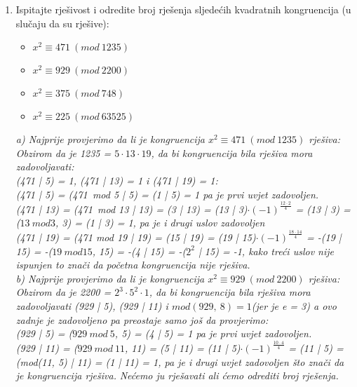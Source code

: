 \documentclass[12pt]{article}
\begin{document}
\begin{enumerate}
\begin{center}
            \end{center}
	    \item Ispitajte rješivost i odredite broj rješenja sljedećih kvadratnih kongruencija (u slučaju da su rješive):
        \begin{center}
        \begin{itemize}
            \item $x^2\equiv 471\ (mod\ 1235)$
            \item $x^2\equiv 929\ (mod\ 2200)$
            \item $x^2\equiv 375\ (mod\ 748)$
            \item $x^2\equiv 225\ (mod\ 63525)$
        \end{itemize}
          \vspace*{0.75cm}
        \textit{a) Najprije provjerimo da li je kongruencija $x^2\equiv 471\ (mod\ 1235)$ rješiva:\\Obzirom da je 1235 = $5\cdot13\cdot19$, da bi kongruencija bila rješiva mora zadovoljavati:\\(471 | 5) = 1, (471 | 13) = 1 i (471 | 19) = 1:\\ (471 | 5) = (471\ mod 5 | 5) = (1 | 5) = 1 pa je prvi uvjet zadovoljen.\\ (471 | 13) = (471\ mod 13 | 13) = (3 | 13) = (13 | 3)$\cdot (-1)^{\frac{12\cdot2}{4}}$ = (13 | 3) = ($13\ mod 3$, 3) = (1 | 3) = 1, pa je i drugi uslov zadovoljen\\
        (471 | 19) = (471 mod 19 | 19) = (15 | 19) = (19 | 15)$\cdot (-1)^{\frac{18\cdot14}{4}}$ = -(19 | 15) = -($19\ mod 15$, 15) = -(4 | 15) = -($2^2$ | 15) = -1, kako treći uslov nije ispunjen to znači da početna kongruencija nije rješiva.}\\
          \vspace*{0.75cm}
          \textit{b) Najprije provjerimo da li je kongruencija $x^2\equiv 929\ (mod\ 2200)$ rješiva:\\Obzirom da je 2200 = $2^3\cdot5^2\cdot1$, da bi kongruencija bila rješiva mora zadovoljavati (929 | 5), (929 | 11) i $mod(929,\ 8)=1$(jer je e = 3) a ovo zadnje je zadovoljeno pa preostaje samo još da provjerimo:\\ (929 | 5) = ($929\ mod\ 5$, 5) = (4 | 5) = 1 pa je prvi uvjet zadovoljen.\\ (929 | 11) = ($929\ mod\ 11$, 11) = (5 | 11) = (11 | 5)$\cdot (-1)^{\frac{10\cdot4}{4}}$ = (11 | 5) = (mod(11, 5) | 11) = (1 | 11) = 1, pa je i drugi uvjet zadovoljen što znači da je kongruencija rješiva.}
          \textit{Nećemo ju rješavati ali ćemo odrediti broj rješenja.\\
}
\end{center}
\end{enumerate}
\end{document}
